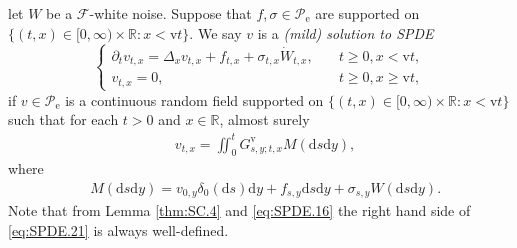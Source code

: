 \documentclass[12pt,a4paper]{amsart}
\numberwithin{equation}{section}
\theoremstyle{plain}
\theoremstyle{remark}
\begin{document}
let $W$ be a $\mathcal F$-white noise. Suppose that $f,\sigma \in \mathscr P_\mathrm e$ are supported on $\{(t,x) \in [0,\infty)\times \mathbb R: x<\mathrm vt\}$.
We say $v$ is a \emph{(mild) solution to SPDE}
\begin{equation} \label{eq:SPDE.2}
\begin{cases}
\partial_t v_{t,x} = \Delta_x v_{t,x} + f_{t,x} + \sigma_{t,x} \dot W_{t,x}, &\quad t\geq 0, x < \mathrm vt,\\
v_{t,x} = 0, &\quad t\geq 0, x\geq \mathrm vt,
\end{cases}
\end{equation}
if $v\in \mathscr P_\mathrm e$ is a continuous random field supported on $\{(t,x) \in [0,\infty)\times \mathbb R: x<\mathrm vt\}$ such that for each $t> 0$ and $x\in \mathbb R$, almost surely 
\begin{align} \label{eq:SPDE.21}
&  v_{t,x} 
	= \iint_0^t G^\mathrm v_{s,y;t,x} M(\mathrm ds\mathrm dy),
\end{align}
	where 
\begin{align} 
& M(\mathrm ds\mathrm dy) = v_{0,y} \delta_0(\mathrm ds) \mathrm dy + f_{s,y}\mathrm ds\mathrm dy + \sigma_{s,y}W(\mathrm ds\mathrm dy).
\end{align}
Note that from Lemma \ref{thm:SC.4} and \eqref{eq:SPDE.16} the right hand side of \eqref{eq:SPDE.21} is always well-defined.
\end{document}
